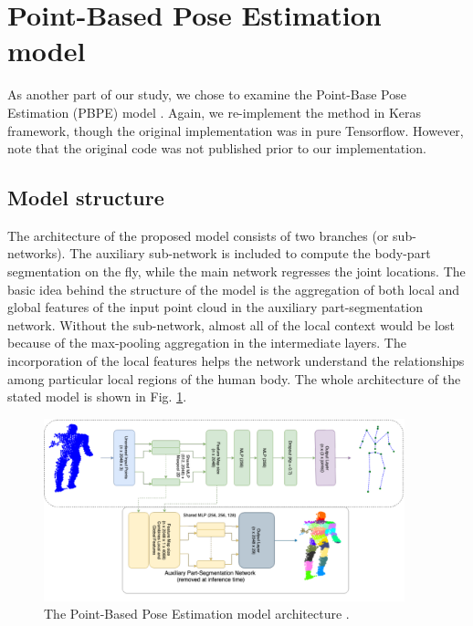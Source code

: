 \section{Point-Based Pose Estimation model}

As another part of our study, we chose to examine the Point-Base Pose Estimation (PBPE) model \cite{Ali19}. Again, we re-implement the method in Keras framework, though the original implementation was in pure Tensorflow. However, note that the original code was not published prior to our implementation.\par
\vspace{5mm}
\noindent %



\subsection{Model structure}
The architecture of the proposed model consists of two branches (or sub-networks). The auxiliary sub-network is included to compute the body-part segmentation on the fly, while the main network regresses the joint locations. The basic idea behind the structure of the model is the aggregation of both local and global features of the input point cloud in the auxiliary part-segmentation network. Without the sub-network, almost all of the local context would be lost because of the max-pooling aggregation in the intermediate layers. The incorporation of the local features helps the network understand the relationships among particular local regions of the human body. The whole architecture of the stated model is shown in Fig. \ref{fig:PBPE}.\par
\vspace{5mm}

\begin{figure}[H]
\begin{center}
  \includegraphics[height=200px]{images/related_work/pbpe2.PNG}
  \caption{The Point-Based Pose Estimation model architecture \cite{Ali19}.}
  \label{fig:PBPE}
\end{center}
\end{figure}

